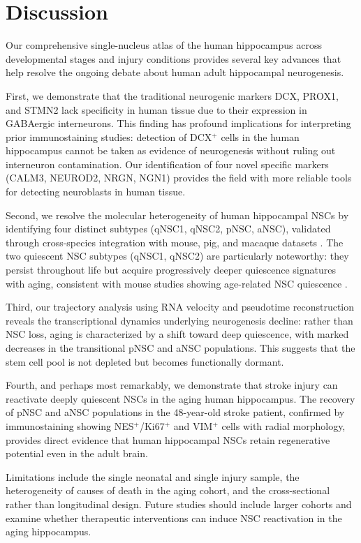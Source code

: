 \documentclass[11pt]{article}
\begin{document}
\section{Discussion}

Our comprehensive single-nucleus atlas of the human hippocampus across developmental stages and injury conditions provides several key advances that help resolve the ongoing debate about human adult hippocampal neurogenesis.

First, we demonstrate that the traditional neurogenic markers DCX, PROX1, and STMN2 lack specificity in human tissue due to their expression in GABAergic interneurons. This finding has profound implications for interpreting prior immunostaining studies: detection of DCX$^+$ cells in the human hippocampus cannot be taken as evidence of neurogenesis without ruling out interneuron contamination. Our identification of four novel specific markers (CALM3, NEUROD2, NRGN, NGN1) provides the field with more reliable tools for detecting neuroblasts in human tissue.

Second, we resolve the molecular heterogeneity of human hippocampal NSCs by identifying four distinct subtypes (qNSC1, qNSC2, pNSC, aNSC), validated through cross-species integration with mouse, pig, and macaque datasets \citep{hochgerner2018conserved, franjic2022transcriptomic}. The two quiescent NSC subtypes (qNSC1, qNSC2) are particularly noteworthy: they persist throughout life but acquire progressively deeper quiescence signatures with aging, consistent with mouse studies showing age-related NSC quiescence \citep{leeman2018lysosome}.

Third, our trajectory analysis using RNA velocity \citep{lamanno2018rna} and pseudotime reconstruction reveals the transcriptional dynamics underlying neurogenesis decline: rather than NSC loss, aging is characterized by a shift toward deep quiescence, with marked decreases in the transitional pNSC and aNSC populations. This suggests that the stem cell pool is not depleted but becomes functionally dormant.

Fourth, and perhaps most remarkably, we demonstrate that stroke injury can reactivate deeply quiescent NSCs in the aging human hippocampus. The recovery of pNSC and aNSC populations in the 48-year-old stroke patient, confirmed by immunostaining showing NES$^+$/Ki67$^+$ and VIM$^+$ cells with radial morphology, provides direct evidence that human hippocampal NSCs retain regenerative potential even in the adult brain.

Limitations include the single neonatal and single injury sample, the heterogeneity of causes of death in the aging cohort, and the cross-sectional rather than longitudinal design. Future studies should include larger cohorts and examine whether therapeutic interventions can induce NSC reactivation in the aging hippocampus.
\end{document}
